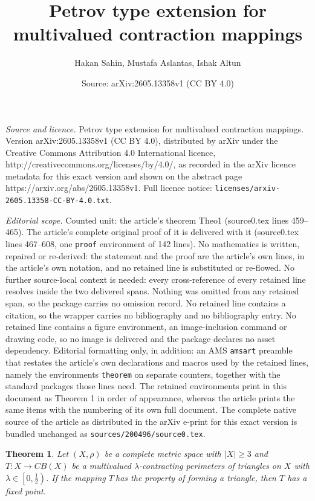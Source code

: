 \documentclass[10pt,a4paper]{amsart}
\title{Petrov type extension for multivalued contraction mappings}
\author{Hakan Sahin, Mustafa Aslantas, Ishak Altun}
\date{Source: arXiv:2605.13358v1 (CC BY 4.0)}
\newtheorem{theorem}{Theorem}
\begin{document}
\maketitle

\noindent\emph{Source and licence.} Petrov type extension for multivalued contraction mappings. Version arXiv:2605.13358v1 (CC BY 4.0), distributed by arXiv under the Creative Commons Attribution 4.0 International licence, http://creativecommons.org/licenses/by/4.0/, as recorded in the arXiv licence metadata for this exact version and shown on the abstract page https://arxiv.org/abs/2605.13358v1. Full licence notice: \texttt{licenses/arxiv-2605.13358-CC-BY-4.0.txt}.\par\smallskip

\noindent\textit{Editorial scope.} Counted unit: the article's theorem Theo1 (source0.tex lines 459--465). The article's complete original proof of it is delivered with it (source0.tex lines 467--608, one \texttt{proof} environment of 142 lines). No mathematics is written, repaired or re-derived: the statement and the proof are the article's own lines, in the article's own notation, and no retained line is substituted or re-flowed.  No further source-local context is needed: every cross-reference of every retained line resolves inside the two delivered spans.  Nothing was omitted from any retained span, so the package carries no omission record.  No retained line contains a citation, so the wrapper carries no bibliography and no bibliography entry.  No retained line contains a figure environment, an image-inclusion command or drawing code, so no image is delivered and the package declares no asset dependency.  Editorial formatting only, in addition: an AMS \texttt{amsart} preamble that restates the article's own declarations and macros used by the retained lines, namely the environments \texttt{theorem} on separate counters, together with the standard packages those lines need.  The retained environments print in this document as Theorem 1 in order of appearance, whereas the article prints the same items with the numbering of its own full document.  The complete native source of the article as distributed in the arXiv e-print for this exact version is bundled unchanged as \texttt{sources/200496/source0.tex}.
\begin{theorem}
\label{Theo1}Let $\left( X,\rho \right) $ be a complete metric space with $%
\left \vert X\right \vert \geq 3$ and $T:X\rightarrow CB(X)$ be a
multivalued $\lambda $-contracting perimeters of triangles on $X$ with $%
\lambda \in \left[ 0,\frac{1}{2}\right) $. If the mapping $T~$has the
property of forming a triangle, then $T$ has a fixed point.
\end{theorem}
\end{document}

